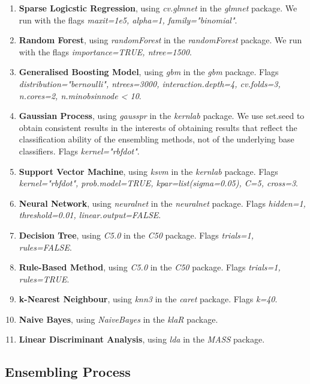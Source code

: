 \documentclass{document}
\begin{document}
\begin{enumerate}

    \item \textbf{Sparse Logicstic Regression}, using \textit{cv.glmnet} in the \textit{glmnet} package. We run with the flags \textit{maxit=1e5, alpha=1, family="binomial"}.
    \item \textbf{Random Forest}, using \textit{randomForest} in the \textit{randomForest} package. We run with the flags \textit{importance=TRUE, ntree=1500}.
    \item \textbf{Generalised Boosting Model}, using \textit{gbm} in the \textit{gbm} package. Flags \textit{distribution="bernoulli", ntrees=3000, interaction.depth=4, cv.folds=3, n.cores=2, n.minobsinnode < 10}.
    \item \textbf{Gaussian Process}, using \textit{gausspr} in the \textit{kernlab} package. We use set.seed to obtain consistent results in the interests of obtaining results that reflect the classification ability of the ensembling methods, not of the underlying base classifiers. Flags \textit{kernel="rbfdot"}.
    \item \textbf{Support Vector Machine}, using \textit{ksvm} in the \textit{kernlab} package. Flags \textit{kernel="rbfdot", prob.model=TRUE, kpar=list(sigma=0.05), C=5, cross=3}.
    \item \textbf{Neural Network}, using \textit{neuralnet} in the \textit{neuralnet} package. Flags \textit{hidden=1, threshold=0.01, linear.output=FALSE}.
    \item \textbf{Decision Tree}, using \textit{C5.0} in the \textit{C50} package. Flags \textit{trials=1, rules=FALSE}.
    \item \textbf{Rule-Based Method}, using \textit{C5.0} in the \textit{C50} package. Flags \textit{trials=1, rules=TRUE}.
    \item \textbf{k-Nearest Neighbour}, using \textit{knn3} in the \textit{caret} package. Flags \textit{k=40}.
    \item \textbf{Naive Bayes}, using \textit{NaiveBayes} in the \textit{klaR} package.
    \item \textbf{Linear Discriminant Analysis}, using \textit{lda} in the  \textit{MASS} package. 
\end{enumerate}


\subsection{Ensembling Process}
\label{ensemblingprocess}
\end{document}
